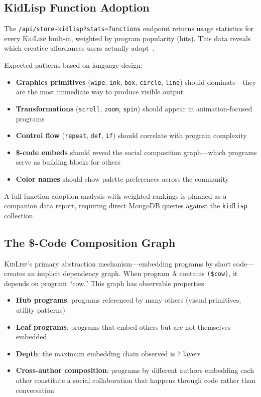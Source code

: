\documentclass[10pt,letterpaper,twocolumn]{article}
\newcommand{\kl}{\textsc{KidLisp}}
\begin{document}
\subsection{KidLisp Function Adoption}

The \texttt{/api/store-kidlisp?stats=functions} endpoint returns usage statistics for every \kl{} built-in, weighted by program popularity (hits). This data reveals which creative affordances users actually adopt~\citep{scudder2026kidlisp}.

Expected patterns based on language design:
\begin{itemize}
  \item \textbf{Graphics primitives} (\texttt{wipe}, \texttt{ink}, \texttt{box}, \texttt{circle}, \texttt{line}) should dominate---they are the most immediate way to produce visible output
  \item \textbf{Transformations} (\texttt{scroll}, \texttt{zoom}, \texttt{spin}) should appear in animation-focused programs
  \item \textbf{Control flow} (\texttt{repeat}, \texttt{def}, \texttt{if}) should correlate with program complexity
  \item \textbf{\$-code embeds} should reveal the social composition graph---which programs serve as building blocks for others
  \item \textbf{Color names} should show palette preferences across the community
\end{itemize}

A full function adoption analysis with weighted rankings is planned as a companion data report, requiring direct MongoDB queries against the \texttt{kidlisp} collection.

\subsection{The \$-Code Composition Graph}

\kl{}'s primary abstraction mechanism---embedding programs by short code---creates an implicit dependency graph. When program A contains \texttt{(\$cow)}, it depends on program ``cow.'' This graph has observable properties:

\begin{itemize}
  \item \textbf{Hub programs}: programs referenced by many others (visual primitives, utility patterns)
  \item \textbf{Leaf programs}: programs that embed others but are not themselves embedded
  \item \textbf{Depth}: the maximum embedding chain observed is 7 layers
  \item \textbf{Cross-author composition}: programs by different authors embedding each other constitute a social collaboration that happens through code rather than conversation
\end{itemize}
\end{document}
